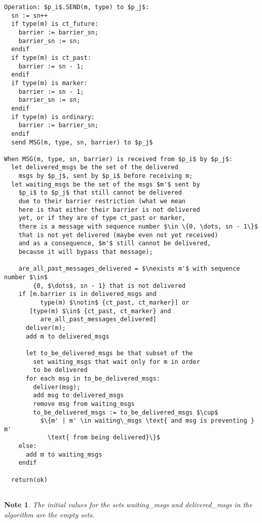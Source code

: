 \documentclass[12pt]{article}
\theoremstyle{plain}
\begin{document}
\clearpage

\begin{lstlisting}[frame=single]
Operation: $p_i$.SEND(m, type) to $p_j$:
  sn := sn++
  if type(m) is ct_future:
    barrier := barrier_sn;
    barrier_sn := sn;
  endif
  if type(m) is ct_past:
    barrier := sn - 1;
  endif
  if type(m) is marker:
    barrier := sn - 1;
    barrier_sn := sn;
  endif
  if type(m) is ordinary:
    barrier := barrier_sn;
  endif
  send MSG(m, type, sn, barrier) to $p_j$

When MSG(m, type, sn, barrier) is received from $p_i$ by $p_j$:
  let delivered_msgs be the set of the delivered 
    msgs by $p_j$, sent by $p_i$ before receiving m;
  let waiting_msgs be the set of the msgs $m'$ sent by
    $p_i$ to $p_j$ that still cannot be delivered
    due to their barrier restriction (what we mean
    here is that either their barrier is not delivered
    yet, or if they are of type ct_past or marker,
    there is a message with sequence number $\in \{0, \dots, sn - 1\}$
    that is not yet delivered (maybe even not yet received)
    and as a consequence, $m'$ still cannot be delivered,
    because it will bypass that message);
    
    are_all_past_messages_delivered = $\nexists m'$ with sequence number $\in$ 
        {0, $\dots$, sn - 1} that is not delivered
    if [m.barrier is in delivered_msgs and
          type(m) $\notin$ {ct_past, ct_marker}] or
       [type(m) $\in$ {ct_past, ct_marker} and
          are_all_past_messages_delivered]
      deliver(m);
      add m to delivered_msgs

      let to_be_delivered_msgs be that subset of the
        set waiting_msgs that wait only for m in order
        to be delivered 
      for each msg in to_be_delivered_msgs:
        deliver(msg);
        add msg to delivered_msgs
        remove msg from waiting_msgs
        to_be_delivered_msgs := to_be_delivered_msgs $\cup$
          $\{m' | m' \in waiting\_msgs \text{ and msg is preventing } m'
            \text{ from being delivered}\}$
    else:
      add m to waiting_msgs
    endif

  return(ok)
 
\end{lstlisting}

\newtheorem*{note1}{Note}
\begin{note1}
  The initial values for the sets waiting\_msgs and delivered\_msgs in the
  algorithm are the empty sets.
\end{note1}
\end{document}
